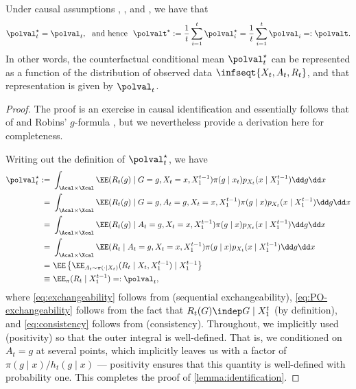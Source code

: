 \begin{lemma}\label{lemma:identification}
  Under causal assumptions , , and , we have that
  \begin{equation}
    \polval_t^\star = \polval_t, ~~\text{and hence}~~ \polvalt^\star := \frac{1}{t}\sum_{i=1}^t \polval_i^\star =  \frac{1}{t}\sum_{i=1}^t \polval_i =: \polvalt.
  \end{equation}
  In other words, the counterfactual conditional mean $\polval_t^\star$ can be represented as a function of the distribution of observed data $\infseqt{X_t, A_t, R_t}$, and that representation is given by $\polval_t$.
\end{lemma}
\begin{proof}
  The proof is an exercise in causal identification and essentially follows that of \citet[Theorem 1]{kennedy2019nonparametric} and Robins' $g$-formula \citep{robins1986new}, but we nevertheless provide a derivation here for completeness.

  Writing out the definition of $\polval_t^\star$, we have
  \begin{align}
    \polval_t^\star :=&\ \int_{\Acal \times \Xcal} \EE(R_t(g) \mid G=g, X_t = x, X_1^{t-1}) \pi(g \mid x_t) p_{X_t}(x \mid X_1^{t-1}) \dd g \dd x  \\ 
    =&\ \int_{\Acal \times \Xcal} \EE(R_t(g) \mid G=g, A_t = g, X_t = x, X_1^{t-1}) \pi(g \mid x) p_{X_t}(x \mid X_1^{t-1}) \dd g \dd x\label{eq:exchangeability} \\ 
    =&\ \int_{\Acal \times \Xcal} \EE(R_t(g) \mid A_t = g, X_t = x, X_1^{t-1}) \pi(g \mid x) p_{X_t}(x \mid X_1^{t-1}) \dd g \dd x\label{eq:PO-exchangeability}\\ 
             =&\ \int_{\Acal \times \Xcal} \EE(R_t \mid A_t = g, X_t = x, X_1^{t-1}) \pi(g \mid x) p_{X_t}(x \mid X_1^{t-1}) \dd g \dd x \label{eq:consistency}\\ 
    =&\ \EE \left \{ \EE_{A_t \sim \pi(\cdot \mid X_t)} (R_t \mid X_t, X_1^{t-1}) \mid X_1^{t-1} \right \}\\
    \equiv&\ \EE_\pi(R_t \mid X_1^{t-1}) =: \polval_t,
  \end{align}
  where \eqref{eq:exchangeability} follows from  (sequential exchangeability), \eqref{eq:PO-exchangeability} follows from the fact that $R_t (G) \indep G \mid X_1^t$ (by definition), and \eqref{eq:consistency} follows from  (consistency). Throughout, we implicitly used  (positivity) so that the outer integral is well-defined. That is, we conditioned on $A_t = g$ at several points, which implicitly leaves us with a factor of $\pi(g \mid x) / h_t(g \mid x)$ --- positivity ensures that this quantity is well-defined with probability one. This completes the proof of \cref{lemma:identification}.

\end{proof}

